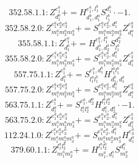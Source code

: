 \documentclass[letterpaper,10pt,fleqn,leqno,onecolumn]{article}
\begin{document}
\begin{equation} \;\;\;\;\;\;  352.58.1.1: Z^{e_{1}^{a}}_{d_{1}^{a}}+=H^{e_{1}^{a},l_{1}^{b}}_{d_{1}^{b},d_{1}^{a}}S^{d_{1}^{b}}_{l_{1}^{b}}\cdot -1. \end{equation}
\begin{equation} \;\;\;\;\;\;  352.58.2.0: Z^{e_{1}^{a}e_{2}^{a}e_{3}^{a}}_{m_{1}^{a}m_{2}^{a}m_{3}^{a}}+=S^{e_{1}^{a}e_{2}^{a},d_{1}^{a}}_{m_{1}^{a}m_{2}^{a}m_{3}^{a}}Z^{e_{3}^{a}}_{d_{1}^{a}} \end{equation}
\begin{equation} \;\;\;\;\;\;  355.58.1.1: Z^{e_{1}^{a}}_{d_{1}^{a}}+=H^{e_{1}^{a},l_{1}^{a}}_{d_{1}^{a},d_{2}^{a}}S^{d_{2}^{a}}_{l_{1}^{a}} \end{equation}
\begin{equation} \;\;\;\;\;\;  355.58.2.0: Z^{e_{1}^{a}e_{2}^{a}e_{3}^{a}}_{m_{1}^{a}m_{2}^{a}m_{3}^{a}}+=S^{e_{1}^{a}e_{2}^{a},d_{1}^{a}}_{m_{1}^{a}m_{2}^{a}m_{3}^{a}}Z^{e_{3}^{a}}_{d_{1}^{a}} \end{equation}
\begin{equation} \;\;\;\;\;\;  557.75.1.1: Z^{e_{1}^{a}}_{d_{1}^{a}}+=S^{e_{1}^{a},d_{1}^{b}}_{l_{1}^{a}l_{1}^{b}}H^{l_{1}^{a}l_{1}^{b}}_{d_{1}^{b},d_{1}^{a}} \end{equation}
\begin{equation} \;\;\;\;\;\;  557.75.2.0: Z^{e_{1}^{a}e_{2}^{a}e_{3}^{a}}_{m_{1}^{a}m_{2}^{a}m_{3}^{a}}+=S^{e_{1}^{a}e_{2}^{a},d_{1}^{a}}_{m_{1}^{a}m_{2}^{a}m_{3}^{a}}Z^{e_{3}^{a}}_{d_{1}^{a}} \end{equation}
\begin{equation} \;\;\;\;\;\;  563.75.1.1: Z^{e_{1}^{a}}_{d_{1}^{a}}+=S^{e_{1}^{a},d_{2}^{a}}_{l_{1}^{a}l_{2}^{a}}H^{l_{1}^{a}l_{2}^{a}}_{d_{1}^{a},d_{2}^{a}}\cdot -1. \end{equation}
\begin{equation} \;\;\;\;\;\;  563.75.2.0: Z^{e_{1}^{a}e_{2}^{a}e_{3}^{a}}_{m_{1}^{a}m_{2}^{a}m_{3}^{a}}+=S^{e_{1}^{a}e_{2}^{a},d_{1}^{a}}_{m_{1}^{a}m_{2}^{a}m_{3}^{a}}Z^{e_{3}^{a}}_{d_{1}^{a}} \end{equation}
\begin{equation} \;\;\;\;\;\;  112.24.1.0: Z^{e_{1}^{a}e_{2}^{a}e_{3}^{a}}_{m_{1}^{a}m_{2}^{a}m_{3}^{a}}+=S^{e_{1}^{a}e_{2}^{a},d_{1}^{a}}_{m_{1}^{a}m_{2}^{a}m_{3}^{a}}H^{e_{3}^{a}}_{d_{1}^{a}} \end{equation}
\begin{equation} \;\;\;\;\;\;  379.60.1.1: Z^{l_{1}^{a}l_{2}^{a}}_{m_{1}^{a}m_{2}^{a}}+=H^{l_{1}^{a}l_{2}^{a}}_{m_{1}^{a},d_{1}^{a}}S^{d_{1}^{a}}_{m_{2}^{a}} \end{equation}
\end{document}
